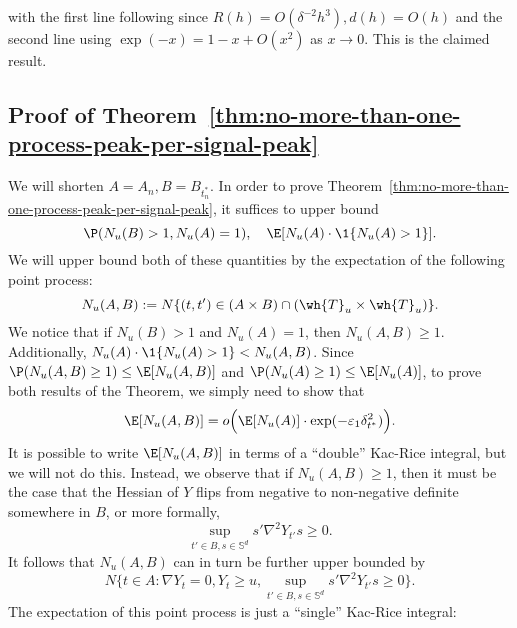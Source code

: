 \documentclass{article}
\newcommand{\ag}[1]{{\bf{{\red{[{AG: #1}]}}}}}
\begin{document}
	with the first line following since $R(h) = O(\delta^{-2}h^3), d(h) = O(h)$ and the second line using $\exp(-x) = 1 - x + O(x^2)$ as $x \to 0$. This is the claimed result.
	
	\subsection{Proof of Theorem~\ref{thm:no-more-than-one-process-peak-per-signal-peak}}
	\label{subsec:pf-no-more-than-one-process-peak-per-signal-peak}
	\ag{TO COME}
	
	\iffalse
	We will shorten $A = A_n, B = B_{t_n^{\ast}}$. In order to prove Theorem~\ref{thm:no-more-than-one-process-peak-per-signal-peak}, it suffices to upper bound
	\begin{equation*}
		\P(N_{u}(B) > 1, N_{u}(A) = 1), \quad \E[N_{u}(A) \cdot \1\{N_{u}(A) > 1\}].
	\end{equation*}
	We will upper bound both of these quantities by the expectation of the following point process:
	\begin{equation*}
		N_{u}(A,B) := N\{(t,t') \in (A \times B) \cap (\wh{T}_{u} \times \wh{T}_{u})\}.
	\end{equation*}
	We notice that if $N_{u}(B) > 1$ and $N_{u}(A) = 1$, then $N_{u}(A,B) \geq 1$. Additionally, $N_{u}(A) \cdot \1\{N_{u}(A) > 1\} < N_{u}(A,B)$. Since $\P(N_{u}(A,B) \geq 1) \leq \E[N_{u}(A,B)]$ and $\P(N_{u}(A) \geq 1) \leq \E[N_{u}(A)]$, to prove both results of the Theorem, we simply need to show that
	\begin{equation*}
		\E[N_{u}(A,B)] = o\Big(\E[N_{u}(A)] \cdot \exp(-\varepsilon_1\delta_{t^{\ast}}^2)\Big).
	\end{equation*}
	It is possible to write $\E[N_{u}(A,B)]$ in terms of a ``double'' Kac-Rice integral, but we will not do this. Instead, we observe that if $N_{u}(A,B) \geq 1$, then it must be the case that the Hessian of $Y$ flips from negative to non-negative definite somewhere in $B$, or more formally, \ag{Argue why}
	$$
	\sup_{t' \in B, s \in \mathbb{S}^{d}} s' \nabla^2 Y_{t'} s \geq 0. 
	$$
	It follows that $N_{u}(A,B)$ can in turn be further upper bounded by
	$$
	N\Big\{t \in A: \nabla Y_t = 0, Y_t \geq u, \sup_{t' \in B, s \in \mathbb{S}^{d}} s' \nabla^2 Y_{t'} s \geq 0 \Big\}.
	$$
	The expectation of this point process is just a ``single'' Kac-Rice integral:
\end{document}

